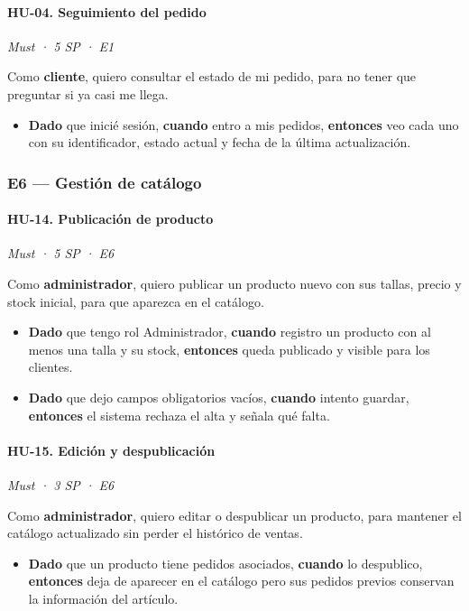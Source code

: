 \documentclass[12pt, a4paper]{article}
\newcommand{\hutag}[3]{\textit{#1 · #2 · #3}\par\vspace{2pt}}
\begin{document}
\paragraph{HU-04. Seguimiento del pedido}
\hutag{Must}{5 SP}{E1}
Como \textbf{cliente}, quiero consultar el estado de mi pedido, para no tener que preguntar si ya casi me llega.
\begin{itemize}[leftmargin=*]
    \item \textbf{Dado} que inicié sesión, \textbf{cuando} entro a mis pedidos, \textbf{entonces} veo cada uno con su identificador, estado actual y fecha de la última actualización.
\end{itemize}

\subsubsection{E6 --- Gestión de catálogo}

\paragraph{HU-14. Publicación de producto}
\hutag{Must}{5 SP}{E6}
Como \textbf{administrador}, quiero publicar un producto nuevo con sus tallas, precio y stock inicial, para que aparezca en el catálogo.
\begin{itemize}[leftmargin=*]
    \item \textbf{Dado} que tengo rol Administrador, \textbf{cuando} registro un producto con al menos una talla y su stock, \textbf{entonces} queda publicado y visible para los clientes.
    \item \textbf{Dado} que dejo campos obligatorios vacíos, \textbf{cuando} intento guardar, \textbf{entonces} el sistema rechaza el alta y señala qué falta.
\end{itemize}

\paragraph{HU-15. Edición y despublicación}
\hutag{Must}{3 SP}{E6}
Como \textbf{administrador}, quiero editar o despublicar un producto, para mantener el catálogo actualizado sin perder el histórico de ventas.
\begin{itemize}[leftmargin=*]
    \item \textbf{Dado} que un producto tiene pedidos asociados, \textbf{cuando} lo despublico, \textbf{entonces} deja de aparecer en el catálogo pero sus pedidos previos conservan la información del artículo.
\end{itemize}
\end{document}
